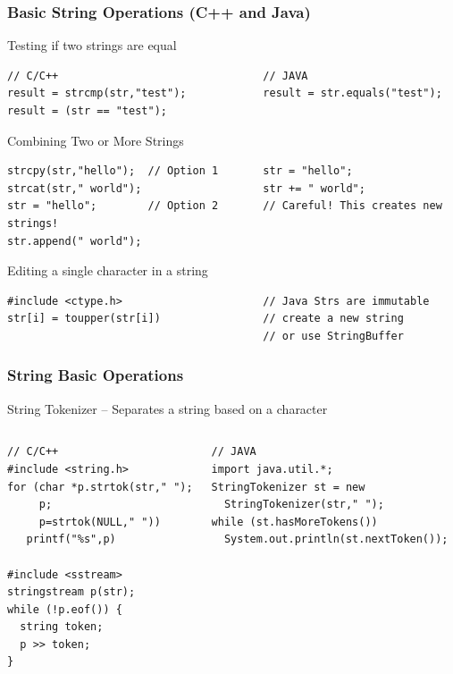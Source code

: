 \begin{frame}[fragile]
  \frametitle{Basic String Operations (C++ and Java)}
  {\smaller

      \begin{block}{Testing if two strings are equal}
\begin{verbatim}
// C/C++                                // JAVA
result = strcmp(str,"test");            result = str.equals("test");
result = (str == "test");
\end{verbatim}
      \end{block}

\begin{block}{Combining Two or More Strings}
\begin{verbatim}
strcpy(str,"hello");  // Option 1       str = "hello";
strcat(str," world");                   str += " world";
str = "hello";        // Option 2       // Careful! This creates new strings!
str.append(" world");
\end{verbatim}
\end{block}


\begin{block}{Editing a single character in a string}
\begin{verbatim}
#include <ctype.h>                      // Java Strs are immutable
str[i] = toupper(str[i])                // create a new string
                                        // or use StringBuffer
\end{verbatim}
\end{block}
}
\end{frame}

\begin{frame}[fragile]
  \frametitle{String Basic Operations}
  {\smaller
    \begin{block}{String Tokenizer -- Separates a string based on a character}
      \begin{columns}[T]
\begin{verbatim}
// C/C++
#include <string.h>
for (char *p.strtok(str," ");
     p;
     p=strtok(NULL," "))
   printf("%s",p)

#include <sstream>
stringstream p(str);
while (!p.eof()) {
  string token;
  p >> token;
}
\end{verbatim}
\begin{verbatim}
// JAVA
import java.util.*;
StringTokenizer st = new
  StringTokenizer(str," ");
while (st.hasMoreTokens())
  System.out.println(st.nextToken());
\end{verbatim}
      \end{columns}
    \end{block}
    }
\end{frame}

